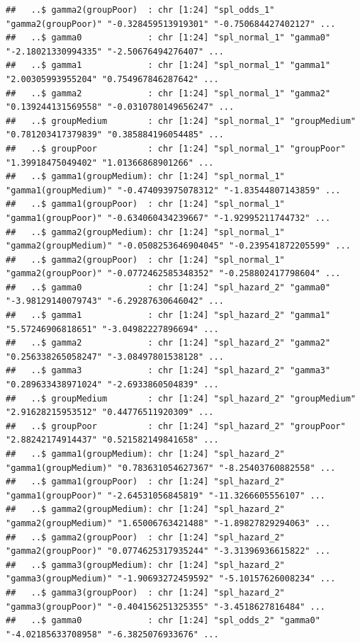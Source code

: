 \documentclass[
]{article}
\begin{document}
\begin{verbatim}
##   ..$ gamma2(groupPoor)  : chr [1:24] "spl_odds_1" "gamma2(groupPoor)" "-0.328459513919301" "-0.750684427402127" ...
##   ..$ gamma0             : chr [1:24] "spl_normal_1" "gamma0" "-2.18021330994335" "-2.50676494276407" ...
##   ..$ gamma1             : chr [1:24] "spl_normal_1" "gamma1" "2.00305993955204" "0.754967846287642" ...
##   ..$ gamma2             : chr [1:24] "spl_normal_1" "gamma2" "0.139244131569558" "-0.0310780149656247" ...
##   ..$ groupMedium        : chr [1:24] "spl_normal_1" "groupMedium" "0.781203417379839" "0.385884196054485" ...
##   ..$ groupPoor          : chr [1:24] "spl_normal_1" "groupPoor" "1.39918475049402" "1.01366868901266" ...
##   ..$ gamma1(groupMedium): chr [1:24] "spl_normal_1" "gamma1(groupMedium)" "-0.474093975078312" "-1.83544807143859" ...
##   ..$ gamma1(groupPoor)  : chr [1:24] "spl_normal_1" "gamma1(groupPoor)" "-0.634060434239667" "-1.92995211744732" ...
##   ..$ gamma2(groupMedium): chr [1:24] "spl_normal_1" "gamma2(groupMedium)" "-0.0508253646904045" "-0.239541872205599" ...
##   ..$ gamma2(groupPoor)  : chr [1:24] "spl_normal_1" "gamma2(groupPoor)" "-0.0772462585348352" "-0.258802417798604" ...
##   ..$ gamma0             : chr [1:24] "spl_hazard_2" "gamma0" "-3.98129140079743" "-6.29287630646042" ...
##   ..$ gamma1             : chr [1:24] "spl_hazard_2" "gamma1" "5.57246906818651" "-3.04982227896694" ...
##   ..$ gamma2             : chr [1:24] "spl_hazard_2" "gamma2" "0.256338265058247" "-3.08497801538128" ...
##   ..$ gamma3             : chr [1:24] "spl_hazard_2" "gamma3" "0.289633438971024" "-2.6933860504839" ...
##   ..$ groupMedium        : chr [1:24] "spl_hazard_2" "groupMedium" "2.91628215953512" "0.44776511920309" ...
##   ..$ groupPoor          : chr [1:24] "spl_hazard_2" "groupPoor" "2.88242174914437" "0.521582149841658" ...
##   ..$ gamma1(groupMedium): chr [1:24] "spl_hazard_2" "gamma1(groupMedium)" "0.783631054627367" "-8.25403760882558" ...
##   ..$ gamma1(groupPoor)  : chr [1:24] "spl_hazard_2" "gamma1(groupPoor)" "-2.64531056845819" "-11.3266605556107" ...
##   ..$ gamma2(groupMedium): chr [1:24] "spl_hazard_2" "gamma2(groupMedium)" "1.65006763421488" "-1.89827829294063" ...
##   ..$ gamma2(groupPoor)  : chr [1:24] "spl_hazard_2" "gamma2(groupPoor)" "0.0774625317935244" "-3.31396936615822" ...
##   ..$ gamma3(groupMedium): chr [1:24] "spl_hazard_2" "gamma3(groupMedium)" "-1.90693272459592" "-5.10157626008234" ...
##   ..$ gamma3(groupPoor)  : chr [1:24] "spl_hazard_2" "gamma3(groupPoor)" "-0.404156251325355" "-3.4518627816484" ...
##   ..$ gamma0             : chr [1:24] "spl_odds_2" "gamma0" "-4.02185633708958" "-6.3825076933676" ...

\end{verbatim}
\end{document}
